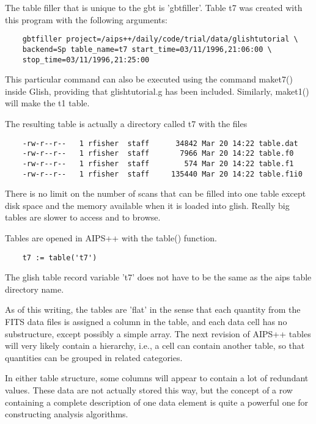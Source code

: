     The table filler that is unique to the gbt is 'gbtfiller'.  Table t7
was created with this program with the following arguments:

\begin{verbatim}
	gbtfiller project=/aips++/daily/code/trial/data/glishtutorial \
	backend=Sp table_name=t7 start_time=03/11/1996,21:06:00 \
	stop_time=03/11/1996,21:25:00
\end{verbatim}

This particular command can also be executed using the command maket7()
inside Glish, providing that glishtutorial.g has been
included. Similarly, maket1() will make the t1 table.

The resulting table is actually a directory called t7 with the files

\begin{verbatim}
	-rw-r--r--   1 rfisher  staff      34842 Mar 20 14:22 table.dat
	-rw-r--r--   1 rfisher  staff       7966 Mar 20 14:22 table.f0
	-rw-r--r--   1 rfisher  staff        574 Mar 20 14:22 table.f1
	-rw-r--r--   1 rfisher  staff     135440 Mar 20 14:22 table.f1i0
\end{verbatim}

There is no limit on the number of scans that can be filled into one table
except disk space and the memory available when it is loaded into glish.
Really big tables are slower to access and to browse.

    Tables are opened in AIPS++ with the table() function.

\begin{verbatim}
	t7 := table('t7')
\end{verbatim}

The glish table record variable 't7' does not have to be the same as the
aips table directory name.

    As of this writing, the tables are 'flat' in the sense that each
quantity from the FITS data files is assigned a column in the table, and
each data cell has no substructure, except possibly a simple array.  The
next revision of AIPS++ tables will very likely contain a hierarchy, i.e.,
a cell can contain another table, so that quantities can be grouped in
related categories.

    In either table structure, some columns will appear to contain a lot of
redundant values.  These data are not actually stored this way, but the
concept of a row containing a complete description of one data element is
quite a powerful one for constructing analysis algorithms.

